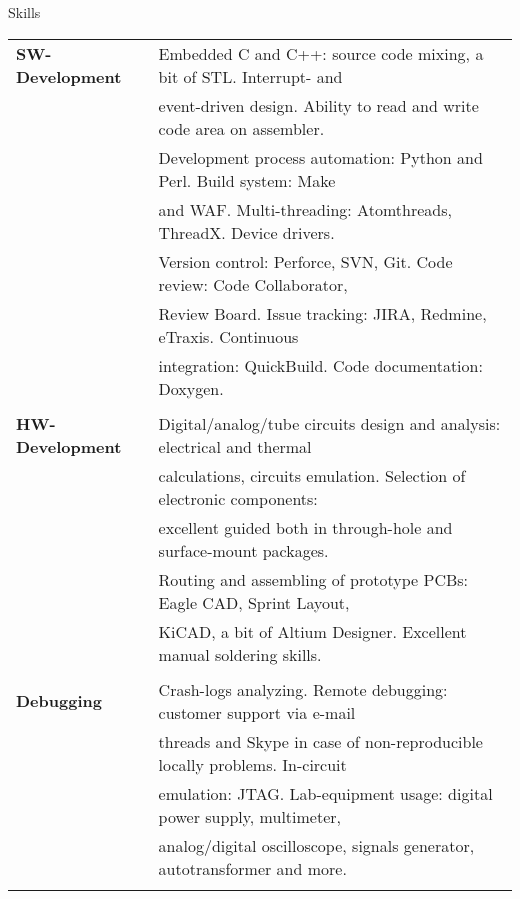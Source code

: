 \documentclass{template}
\begin{document}

\begin{rSection}{Skills}

\begin{tabular}{ @{} >{\bfseries}l @{\hspace{6ex}} l }
SW-Development & Embedded C and C++: source code mixing, a bit of STL. Interrupt- and \\
               & event-driven design. Ability to read and write code area on assembler. \\
               & Development process automation: Python and Perl. Build system: Make \\
               & and WAF. Multi-threading: Atomthreads, ThreadX. Device drivers. \\
               & Version control: Perforce, SVN, Git. Code review: Code Collaborator, \\
               & Review Board. Issue tracking: JIRA, Redmine, eTraxis. Continuous \\
               & integration: QuickBuild. Code documentation: Doxygen. \\ \\

HW-Development & Digital/analog/tube circuits design and analysis: electrical and thermal \\
               & calculations, circuits emulation. Selection of electronic components: \\
               & excellent guided both in through-hole and surface-mount packages. \\
               & Routing and assembling of prototype PCBs: Eagle CAD, Sprint Layout, \\
               & KiCAD, a bit of Altium Designer. Excellent manual soldering skills. \\ \\

Debugging      & Crash-logs analyzing. Remote debugging: customer support via e-mail \\
               & threads and Skype in case of non-reproducible locally problems. In-circuit \\
               & emulation: JTAG. Lab-equipment usage: digital power supply, multimeter, \\
               & analog/digital oscilloscope, signals generator, autotransformer and more. \\ \\


\end{tabular}
\end{rSection}
\end{document}
